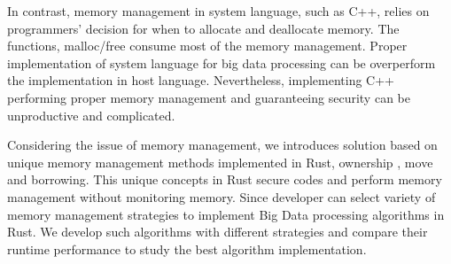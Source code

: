 In contrast, memory management in system language, such as C++, relies on programmers’ decision for when to allocate and deallocate memory. 
The functions, malloc/free consume most of the memory management. Proper implementation of system language for big data processing can be overperform the implementation in host language.
Nevertheless, implementing C++ performing proper memory management and guaranteeing security can be unproductive and complicated. 

Considering the issue of memory management, we introduces solution based on unique memory management methods implemented in Rust, ownership , move and borrowing.
This unique concepts in Rust secure codes and perform memory management without monitoring memory. 
Since developer can select variety of memory management strategies to implement Big Data processing algorithms in Rust.
We develop such algorithms with different strategies and compare their runtime performance to study the best algorithm implementation.



